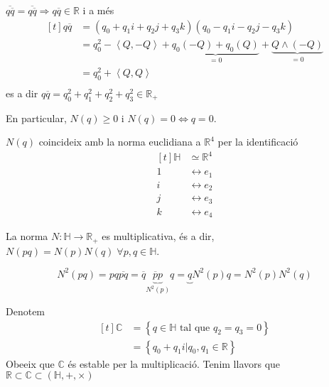 \documentclass[a4paper,12pt]{article}
\begin{document}
	\begin{obs}
	    $\overline{q\overline{q}} = \overline{q\overline{q}} \Rightarrow q\overline{q} \in \mathbb{R}$ i a més
		\begin{displaymath}
			\begin{aligned}[t]
				q\overline{q} &= (q_0 + q_1i + q_2j + q_3k)(q_0 - q_1i - q_2j - q_3k)\\
							  &= q_0^2 - \left\langle Q, -Q\right\rangle + \underbrace{q_0\left(-Q\right) + q_0\left(Q\right)}_{=0} + \underbrace{Q \wedge (-Q)}_{=0}\\
							  &= q_0^2 + \left\langle Q, Q\right\rangle\\
			\end{aligned}
		\end{displaymath}
		es a dir $q\overline{q} = q_0^2+q_1^2+q_2^2+q_3^2 \in \mathbb{R}_+$
	\end{obs}
	En particular, $N(q) \geq 0$ i $ N(q) = 0 \iff q = 0$.
	\begin{obs}
		$N(q)$ coincideix amb la norma euclidiana a $\mathbb{R}^4$ per la identificació
		\begin{displaymath}
			\begin{aligned}[t]
				\mathbb{H} &\simeq \mathbb{R}^4\\
				1 &\leftrightarrow e_1\\
				i &\leftrightarrow e_2\\
				j &\leftrightarrow e_3\\
				k &\leftrightarrow e_4
			\end{aligned}
		\end{displaymath}
	\end{obs}
	\begin{proposicio}
		La norma $N : \mathbb{H} \to \mathbb{R}_+$ es multiplicativa, és a dir, $N(pq) = N(p)N(q)\;\forall p,q \in \mathbb{H}$.
	\end{proposicio}
	\begin{demostracio}
		\begin{displaymath}
			N^2(pq) = pq\overline{pq} = \overline{q}\underbrace{\overline{p}p}_{N^2(p)}q = \underbrace{q}N^2(p)q = N^2(p)N^2(q)
		\end{displaymath}
	\end{demostracio}
	\begin{obs}
		Denotem
		\begin{displaymath}
			\begin{aligned}[t]
				\mathbb{C} &= \left\{q \in \mathbb{H} \text{ tal que } q_2 = q_3 = 0\right\}\\
						   &= \left\{q_0 + q_1i | q_0, q_1 \in \mathbb{R}\right\}
			\end{aligned}
		\end{displaymath}
		Obeeix que $\mathbb{C}$ és estable per la multiplicació.
		Tenim llavors que $\mathbb{R} \subset \mathbb{C} \subset (\mathbb{H}, +, \times)$
	\end{obs}
\end{document}
